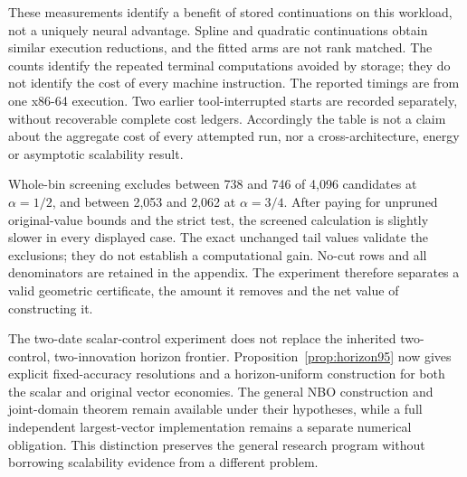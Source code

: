 These measurements identify a benefit of stored continuations on this workload, not a uniquely neural advantage. Spline and quadratic continuations obtain similar execution reductions, and the fitted arms are not rank matched. The counts identify the repeated terminal computations avoided by storage; they do not identify the cost of every machine instruction. The reported timings are from one x86-64 execution. Two earlier tool-interrupted starts are recorded separately, without recoverable complete cost ledgers. Accordingly the table is not a claim about the aggregate cost of every attempted run, nor a cross-architecture, energy or asymptotic scalability result.

Whole-bin screening excludes between 738 and 746 of 4,096 candidates at $\alpha=1/2$, and between 2,053 and 2,062 at $\alpha=3/4$. After paying for unpruned original-value bounds and the strict test, the screened calculation is slightly slower in every displayed case. The exact unchanged tail values validate the exclusions; they do not establish a computational gain. No-cut rows and all denominators are retained in the appendix. The experiment therefore separates a valid geometric certificate, the amount it removes and the net value of constructing it.

The two-date scalar-control experiment does not replace the inherited two-control, two-innovation horizon frontier. Proposition~\ref{prop:horizon95} now gives explicit fixed-accuracy resolutions and a horizon-uniform construction for both the scalar and original vector economies. The general NBO construction and joint-domain theorem remain available under their hypotheses, while a full independent largest-vector implementation remains a separate numerical obligation. This distinction preserves the general research program without borrowing scalability evidence from a different problem.

